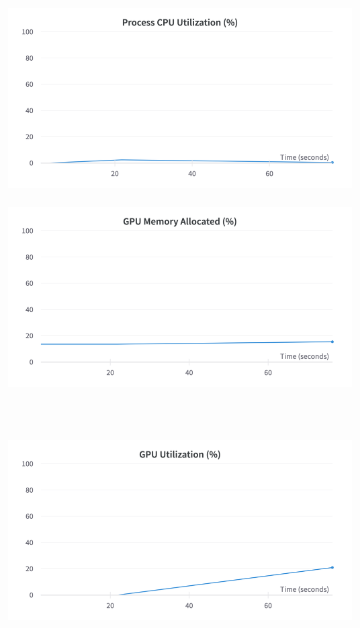 \begin{figure}[]
	\centering
	\begin{subfigure}{0.43\textwidth}
		\centering
		\includegraphics[width=\textwidth]{chapters/3_models/imgs/ufnc/ufcncpusage.png}
	\end{subfigure}
	\hspace{.5cm}
	\begin{subfigure}{0.43\textwidth}
		\centering
		\includegraphics[width=\textwidth]{chapters/3_models/imgs/ufnc/ufcnmem.png}
	\end{subfigure}\\
	\begin{subfigure}{0.43\textwidth}
		\centering
		\includegraphics[width=\textwidth]{chapters/3_models/imgs/ufnc/ufcnusagevera.png}

\end{subfigure}
\end{figure}
